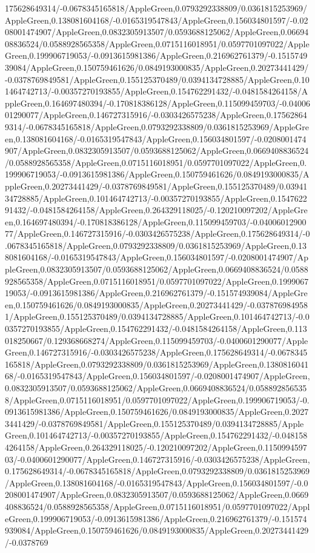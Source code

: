 {\begin{tikzternal}
{175628649314/-0.0678345165818/AppleGreen,0.0793292338809/0.0361815253969/AppleGreen,0.138081604168/-0.0165319547843/AppleGreen,0.156034801597/-0.0208001474907/AppleGreen,0.0832305913507/0.0593688125062/AppleGreen,0.0669408836524/0.0588928565358/AppleGreen,0.0715116018951/0.0597701097022/AppleGreen,0.199906719053/-0.0913615981386/AppleGreen,0.216962761379/-0.151574939084/AppleGreen,0.150759461626/0.0849193000835/AppleGreen,0.20273441429/-0.0378769849581/AppleGreen,0.155125370489/0.0394134728885/AppleGreen,0.101464742713/-0.00357270193855/AppleGreen,0.154762291432/-0.0481584264158/AppleGreen,0.164697480394/-0.170818386128/AppleGreen,0.115099459703/-0.0400601290077/AppleGreen,0.146727315916/-0.0303426575238/AppleGreen,0.175628649314/-0.0678345165818/AppleGreen,0.0793292338809/0.0361815253969/AppleGreen,0.138081604168/-0.0165319547843/AppleGreen,0.156034801597/-0.0208001474907/AppleGreen,0.0832305913507/0.0593688125062/AppleGreen,0.0669408836524/0.0588928565358/AppleGreen,0.0715116018951/0.0597701097022/AppleGreen,0.199906719053/-0.0913615981386/AppleGreen,0.150759461626/0.0849193000835/AppleGreen,0.20273441429/-0.0378769849581/AppleGreen,0.155125370489/0.0394134728885/AppleGreen,0.101464742713/-0.00357270193855/AppleGreen,0.154762291432/-0.0481584264158/AppleGreen,0.264329118025/-0.120210097202/AppleGreen,0.164697480394/-0.170818386128/AppleGreen,0.115099459703/-0.0400601290077/AppleGreen,0.146727315916/-0.0303426575238/AppleGreen,0.175628649314/-0.0678345165818/AppleGreen,0.0793292338809/0.0361815253969/AppleGreen,0.138081604168/-0.0165319547843/AppleGreen,0.156034801597/-0.0208001474907/AppleGreen,0.0832305913507/0.0593688125062/AppleGreen,0.0669408836524/0.0588928565358/AppleGreen,0.0715116018951/0.0597701097022/AppleGreen,0.199906719053/-0.0913615981386/AppleGreen,0.216962761379/-0.151574939084/AppleGreen,0.150759461626/0.0849193000835/AppleGreen,0.20273441429/-0.0378769849581/AppleGreen,0.155125370489/0.0394134728885/AppleGreen,0.101464742713/-0.00357270193855/AppleGreen,0.154762291432/-0.0481584264158/AppleGreen,0.113018250667/0.129368668274/AppleGreen,0.115099459703/-0.0400601290077/AppleGreen,0.146727315916/-0.0303426575238/AppleGreen,0.175628649314/-0.0678345165818/AppleGreen,0.0793292338809/0.0361815253969/AppleGreen,0.138081604168/-0.0165319547843/AppleGreen,0.156034801597/-0.0208001474907/AppleGreen,0.0832305913507/0.0593688125062/AppleGreen,0.0669408836524/0.0588928565358/AppleGreen,0.0715116018951/0.0597701097022/AppleGreen,0.199906719053/-0.0913615981386/AppleGreen,0.150759461626/0.0849193000835/AppleGreen,0.20273441429/-0.0378769849581/AppleGreen,0.155125370489/0.0394134728885/AppleGreen,0.101464742713/-0.00357270193855/AppleGreen,0.154762291432/-0.0481584264158/AppleGreen,0.264329118025/-0.120210097202/AppleGreen,0.115099459703/-0.0400601290077/AppleGreen,0.146727315916/-0.0303426575238/AppleGreen,0.175628649314/-0.0678345165818/AppleGreen,0.0793292338809/0.0361815253969/AppleGreen,0.138081604168/-0.0165319547843/AppleGreen,0.156034801597/-0.0208001474907/AppleGreen,0.0832305913507/0.0593688125062/AppleGreen,0.0669408836524/0.0588928565358/AppleGreen,0.0715116018951/0.0597701097022/AppleGreen,0.199906719053/-0.0913615981386/AppleGreen,0.216962761379/-0.151574939084/AppleGreen,0.150759461626/0.0849193000835/AppleGreen,0.20273441429/-0.0378769}
\end{tikzternal}}
